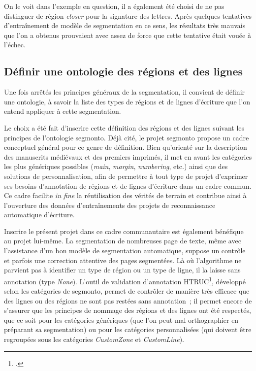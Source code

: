 \documentclass[a4paper,12pt,twoside]{book}
\begin{document}
				On le voit dans l'exemple en question, il a également été choisi de ne pas distinguer de région \textit{closer} pour la signature des lettres. Après quelques tentatives d'entraînement de modèle de \gls{segmentation} en ce sens, les résultats très mauvais que l'on a obtenus prouvaient avec assez de force que cette tentative était vouée à l'échec.
				
			\subsection{Définir une ontologie des régions et des lignes}
				Une fois arrêtés les principes généraux de la \gls{segmentation}, il convient de définir une ontologie, à savoir la liste des types de régions et de lignes d'écriture que l'on entend appliquer à cette \gls{segmentation}.
				
				Le choix a été fait d'inscrire cette définition des régions et des lignes suivant les principes de l'ontologie \gls{segmonto}. Déjà cité, le projet \gls{segmonto} propose un cadre conceptuel général pour ce genre de définition. Bien qu'orienté sur la description des manuscrits médiévaux et des premiers imprimés, il met en avant les catégories les plus génériques possibles (\textit{main}, \textit{margin}, \textit{numbering}, etc.) ainsi que des solutions de personnalisation, afin de permettre à tout type de projet d'exprimer ses besoins d'annotation de régions et de lignes d'écriture dans un cadre commun. Ce cadre facilite \textit{in fine} la réutilisation des vérités de terrain et contribue ainsi à l'ouverture des données d'entraînements des projets de reconnaissance automatique d'écriture.
				
				Inscrire le présent projet dans ce cadre communautaire est également bénéfique au projet lui-même. La \gls{segmentation} de nombreuses page de texte, même avec l'assistance d'un bon modèle de \gls{segmentation} automatique, suppose un contrôle et parfois une correction attentive des pages segmentées. Là où l'algorithme ne parvient pas à identifier un type de région ou un type de ligne, il la laisse sans annotation (type \textit{None}). L'outil de validation d'annotation HTRUC\footcite{clericeHTRUCHTRUnitedCatalog2021}, développé selon les catégories de \gls{segmonto}, permet de contrôler de manière très efficace que des lignes ou des régions ne sont pas restées sans annotation~; il permet encore de s'assurer que les principes de nommage des régions et des lignes ont été respectés, que ce soit pour les catégories génériques (que l'on peut mal orthographier en préparant sa \gls{segmentation}) ou pour les catégories personnalisées (qui doivent être regroupées sous les catégories \textit{CustomZone} et \textit{CustomLine}).
				
\end{document}
